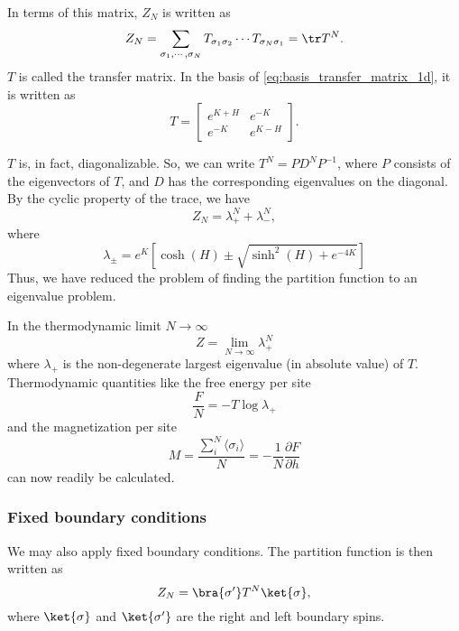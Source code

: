 In terms of this matrix, $Z_N$ is written as
\begin{equation}\label{eq:partition_function_transfer_matrix_1d}
  Z_N = \sum_{\sigma_1, \cdots, \sigma_N} T_{\sigma_1 \sigma_2} \dotsm T_{\sigma_N \sigma_1} = \tr T^N.
\end{equation}
$T$ is called the transfer matrix. In the basis of \autoref{eq:basis_transfer_matrix_1d},
it is written as
\begin{equation}
  T = \begin{bmatrix}
    e^{K+H} & e^{-K} \\
    e^{-K} & e^{K-H}
  \end{bmatrix}.
\end{equation}

$T$ is, in fact, diagonalizable. So, we can write $T^N = P D^N
P^{-1}$, where $P$ consists of the eigenvectors of $T$, and $D$ has the corresponding eigenvalues on the diagonal. By the cyclic property of the
trace, we have
\begin{equation}
  Z_N = \lambda_{+}^{N} + \lambda_{-}^{N},
\end{equation}
where
\begin{equation}
  \lambda_{\pm} = e^{K} \left[ \cosh(H) \pm \sqrt{\sinh^2(H) + e^{-4K}} \right]
\end{equation}
Thus, we have reduced the problem of finding the partition function to an
eigenvalue problem.

In the thermodynamic limit $N \to \infty$
\begin{equation}
  Z = \lim_{N \to \infty} \lambda_{+}^{N}
\end{equation}
where $\lambda_+$ is the non-degenerate largest eigenvalue (in absolute value) of $T$.
Thermodynamic quantities like the free energy per site
\begin{equation}
  \frac{F}{N} = -T \log \lambda_{+}
\end{equation}
and the magnetization per site
\begin{equation}
   M = \frac{\sum_{i}^{N} \langle \sigma_i \rangle}{N} = - \frac{1}{N}\frac{\partial F}{\partial h}
\end{equation}
can now readily be calculated.

\subsubsection{Fixed boundary conditions}\label{sec:fixed_boundary_conditions}
We may also apply fixed boundary conditions. The partition function is then written as
\begin{equation}
  Z_N = \bra{\sigma'}T^N\ket{\sigma},
\end{equation}
where $\ket{\sigma}$ and $\ket{\sigma'}$ are the right and left boundary spins.

